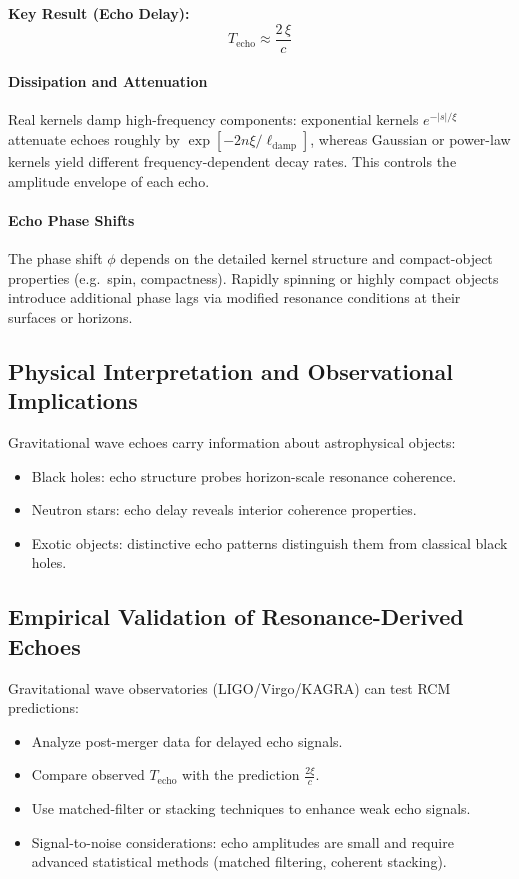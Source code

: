 \begin{framed}
\noindent\textbf{Key Result (Echo Delay):}
\[
T_{\mathrm{echo}} \approx \frac{2\,\xi}{c}
\]
\end{framed}

\paragraph{Dissipation and Attenuation}  
Real kernels damp high-frequency components: exponential kernels \(e^{-|s|/\xi}\) attenuate echoes roughly by \(\exp[-2n\xi/\ell_{\mathrm{damp}}]\), whereas Gaussian or power-law kernels yield different frequency-dependent decay rates. This controls the amplitude envelope of each echo.

\paragraph{Echo Phase Shifts}  
The phase shift \(\phi\) depends on the detailed kernel structure and compact-object properties (e.g.\ spin, compactness). Rapidly spinning or highly compact objects introduce additional phase lags via modified resonance conditions at their surfaces or horizons.

\subsection{Physical Interpretation and Observational Implications}

Gravitational wave echoes carry information about astrophysical objects:
\begin{itemize}
  \item Black holes: echo structure probes horizon-scale resonance coherence.
  \item Neutron stars: echo delay reveals interior coherence properties.
  \item Exotic objects: distinctive echo patterns distinguish them from classical black holes.
\end{itemize}

\subsection{Empirical Validation of Resonance-Derived Echoes}

Gravitational wave observatories (LIGO/Virgo/KAGRA) can test RCM predictions:
\begin{itemize}
  \item Analyze post-merger data for delayed echo signals.
  \item Compare observed \(T_{\mathrm{echo}}\) with the prediction \(\tfrac{2\xi}{c}\).
  \item Use matched-filter or stacking techniques to enhance weak echo signals.
  \item Signal-to-noise considerations: echo amplitudes are small and require advanced statistical methods (matched filtering, coherent stacking).
\end{itemize}

